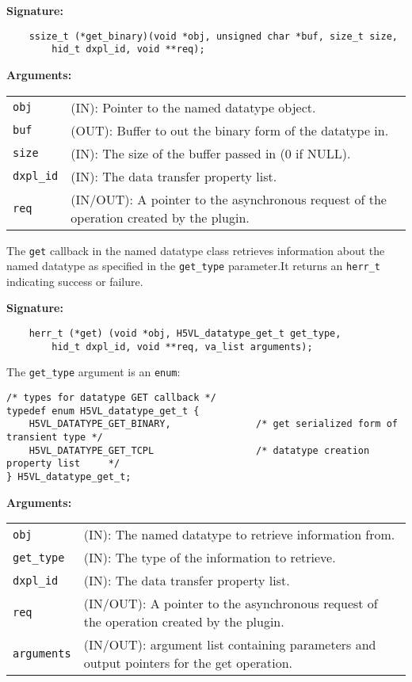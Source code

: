 \begin{mdframed}[style=bgbox]
\textbf{Signature:}
\begin{lstlisting}
    ssize_t (*get_binary)(void *obj, unsigned char *buf, size_t size, 
        hid_t dxpl_id, void **req);
\end{lstlisting}

\textbf{Arguments:}\\
\begin{tabular}{l p{10cm}}
  \texttt{obj} & (IN): Pointer to the named datatype object.\\
  \texttt{buf} & (OUT): Buffer to out the binary form of the datatype in.\\
  \texttt{size} & (IN): The size of the buffer passed in (0 if NULL).\\
  \texttt{dxpl\_id} & (IN): The data transfer property list.\\
  \texttt{req} & (IN/OUT): A pointer to the asynchronous request of the
  operation created by the plugin.\\
\end{tabular}
\end{mdframed}

The \texttt{get} callback in the named datatype class retrieves
information about the named datatype as specified in the \texttt{get\_type}
parameter.It returns an \texttt{herr\_t} indicating success or failure.\bigskip

\begin{mdframed}[style=bgbox]
\textbf{Signature:}
\begin{lstlisting}
    herr_t (*get) (void *obj, H5VL_datatype_get_t get_type, 
        hid_t dxpl_id, void **req, va_list arguments);
\end{lstlisting}

The \texttt{get\_type} argument is an \texttt{enum}:
\begin{lstlisting}
/* types for datatype GET callback */
typedef enum H5VL_datatype_get_t {
    H5VL_DATATYPE_GET_BINARY,               /* get serialized form of transient type */
    H5VL_DATATYPE_GET_TCPL                  /* datatype creation property list     */
} H5VL_datatype_get_t;
\end{lstlisting}

\textbf{Arguments:}\\
\begin{tabular}{l p{10cm}}
  \texttt{obj} & (IN): The named datatype to retrieve information from.\\
  \texttt{get\_type} & (IN): The type of the information to retrieve.\\
  \texttt{dxpl\_id} & (IN): The data transfer property list.\\
  \texttt{req} & (IN/OUT): A pointer to the asynchronous request of the
  operation created by the plugin.\\
  \texttt{arguments} & (IN/OUT): argument list containing parameters and
  output pointers for the get operation. \\
\end{tabular}
\end{mdframed}

